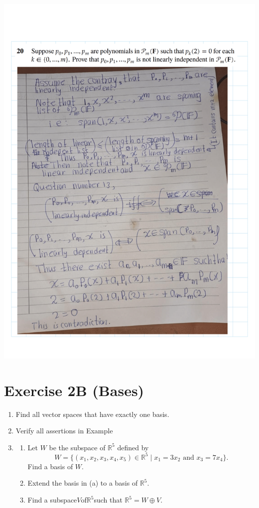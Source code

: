 \documentclass[
]{book}
\theoremstyle{definition}
\theoremstyle{definition}
\theoremstyle{definition}
\theoremstyle{definition}
\theoremstyle{remark}
\begin{document}
\includegraphics{fig/Ex2A/Ex2A-26.png}

\section{Exercise 2B (Bases)}\label{exercise-2b-bases}

\begin{enumerate}
\def\labelenumi{\arabic{enumi}.}
\item
  Find all vector spaces that have exactly one basis.
\item
  Verify all assertions in Example
\item
  \begin{enumerate}
  \def\labelenumii{\alph{enumii}.}
  \item
    Let \(W\) be the subspace of \(\mathbb{R}^5\) defined by
    \[W = \{ (x_1, x_2, x_3, x_4, x_5) \in \mathbb{R}^5 \mid x_1 = 3x_2 \text{ and } x_3 = 7x_4 \}.   \]
    Find a basis of \(W\).
  \item
    Extend the basis in (a) to a basis of \(\mathbb{R}^5\).
  \item
    Find a subspace\(V\)of\(\mathbb{R}^5\)such that \(\mathbb{R}^5 = W \oplus V\).
  \end{enumerate}
\end{enumerate}
\end{document}
